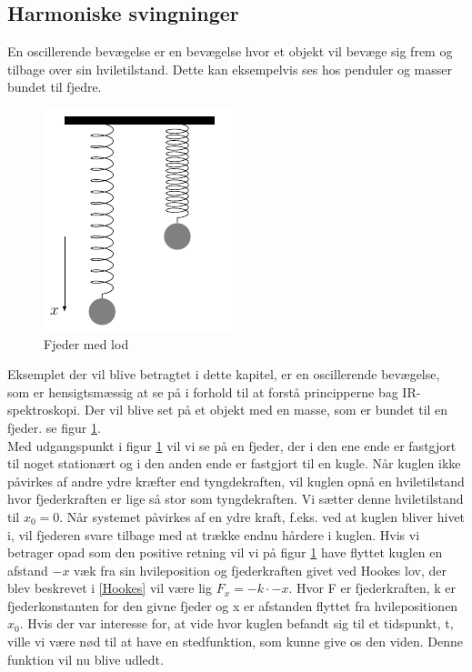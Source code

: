 \subsection{Harmoniske svingninger}\label{teori: Harmoniske svingninger}
En oscillerende bevægelse er en bevægelse hvor et objekt vil bevæge sig frem og tilbage over sin hviletilstand. Dette kan eksempelvis ses hos penduler og masser bundet til fjedre.
\\

\begin{figure}
\centering
\includegraphics[scale=1]{Billeder/fjeder}
\caption{Fjeder med lod \label{fig:fjeder}}
\end{figure} 

Eksemplet der vil blive betragtet i dette kapitel, er en oscillerende bevægelse, som er hensigtsmæssig at se på i forhold til at forstå principperne bag IR-spektroskopi. Der  vil blive set på et objekt med en masse, som er bundet til en fjeder. se figur \ref{fig:fjeder}.
\\

Med udgangspunkt i figur \ref{fig:fjeder} vil vi se på en fjeder, der i den ene ende er fastgjort til noget stationært og i den anden ende er fastgjort til en kugle. Når kuglen ikke påvirkes af andre ydre kræfter end tyngdekraften, vil kuglen opnå en hviletilstand hvor fjederkraften er lige så stor som tyngdekraften. Vi sætter denne hviletilstand til $x_0=0$. Når systemet påvirkes af en ydre kraft, f.eks. ved at kuglen bliver hivet i, vil fjederen svare tilbage med at trække endnu hårdere i kuglen. Hvis vi betrager opad som den positive retning vil vi på figur \ref{fig:fjeder} have flyttet kuglen en afstand $-x$ væk fra sin hvileposition og fjederkraften givet ved Hookes lov, der blev beskrevet i \ref{Hookes} vil være lig $F_x=-k \cdot -x$. Hvor F er fjederkraften, k er fjederkonstanten for den givne fjeder og x er afstanden flyttet fra hvilepositionen $x_0$. Hvis der var interesse for, at vide hvor kuglen befandt sig til et tidspunkt, t, ville vi være nød til at have en stedfunktion, som kunne give os den viden. Denne funktion vil nu blive udledt.